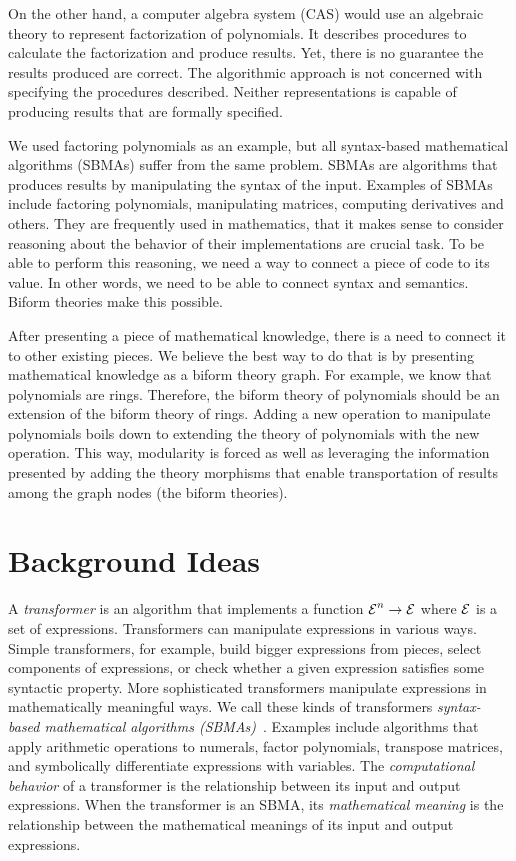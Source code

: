 \documentclass[fleqn]{llncs}
\begin{document}
On the other hand, a computer algebra system (CAS) would use an algebraic
theory to represent factorization of polynomials. It describes procedures to
calculate the factorization and produce results.  Yet, there is no guarantee
the results produced are correct. The algorithmic approach is not concerned
with specifying the procedures described.  Neither representations is capable
of producing results that are formally specified. 

We used factoring polynomials as an example, but all syntax-based mathematical
algorithms (SBMAs) suffer from the same problem. SBMAs are algorithms that
produces results by manipulating the syntax of the input. Examples of SBMAs
include factoring polynomials, manipulating matrices, computing derivatives and
others. They are frequently used in mathematics, that it makes sense to
consider reasoning about the behavior of their implementations are crucial
task.  To be able to perform this reasoning, we need a way to connect a piece
of code to its value. In other words, we need to be able to connect syntax and
semantics. Biform theories make this possible. 

After presenting a piece of mathematical knowledge, there is a need to connect
it to other existing pieces. We believe the best way to do that is by
presenting mathematical knowledge as a biform theory graph. For example, we
know that polynomials are rings. Therefore, the biform theory of polynomials
should be an extension of the biform theory of rings. Adding a new operation to
manipulate polynomials boils down to extending the theory of polynomials with
the new operation. This way, modularity is forced as well as leveraging the
information presented by adding the theory morphisms that enable transportation
of results among the graph nodes (the biform theories).  

\section{Background Ideas}

A \emph{transformer} is an algorithm that implements a function $\mbox{$\cal E$}^n
\rightarrow \mbox{$\cal E$}$ where $\mbox{$\cal E$}$ is a set of expressions.  Transformers can
manipulate expressions in various ways.  Simple transformers, for
example, build bigger expressions from pieces, select components of
expressions, or check whether a given expression satisfies some
syntactic property.  More sophisticated transformers manipulate
expressions in mathematically meaningful ways.  We call these kinds of
transformers \emph{syntax-based mathematical algorithms
  (SBMAs)}~\cite{Farmer13}.  Examples include algorithms that apply
arithmetic operations to numerals, factor polynomials, transpose
matrices, and symbolically differentiate expressions with variables.
The \emph{computational behavior} of a transformer is the relationship
between its input and output expressions.  When the transformer is an
SBMA, its \emph{mathematical meaning} is the relationship between the
mathematical meanings of its input and output expressions.
\end{document}
